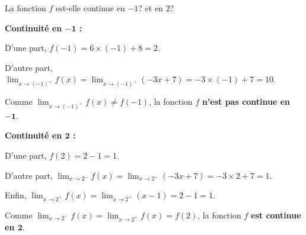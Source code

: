 \documentclass[11pt,a4paper]{article}  %
\begin{document}
	La fonction $f$ est-elle continue en $-1$? et en $2$?
	
	\begin{corrBox}
		\textbf{Continuité en $\bm{-1}$ :}
		
		D'une part, $f(-1)=6 \times(-1)+8=2$.
		
		D'autre part, $\displaystyle\lim _{x \to (-1)^{+}} f(x)=\lim _{x \to (-1)^{+}} (-3x+7)=-3 \times(-1)+7=10$.
		
		Comme $\displaystyle\lim _{x \to (-1)^{+}} f(x)\neq f(-1)$, la fonction $f$ \textbf{n'est pas continue en $\bm{-1}$}.
	\end{corrBox}
	
	\begin{corrBox}
		\textbf{Continuité en $\bm{2}$ :}
		
		D'une part, $f(2)=2-1=1$.
		
		D'autre part, $\displaystyle\lim _{x \to 2^{-}} f(x)=\lim _{x \to 2^{-}} (-3x+7)=-3 \times 2+7=1$.
		
		Enfin, $\displaystyle\lim _{x \to 2^{+}} f(x)=\lim _{x \to 2^{+}} (x-1)=2-1=1$.
		
		Comme $\displaystyle\lim _{x \to 2^{-}} f(x)=\lim _{x \to 2^{+}} f(x)=f(2)$, la fonction $f$ \textbf{est continue en $\bm{2}$}.
	\end{corrBox}
	
	\exerciceDS{}
	
\end{document}
